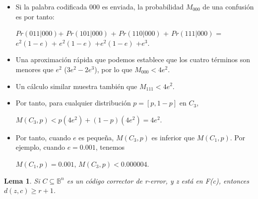 \documentclass{beamer}
\theoremstyle{plain}
\newtheorem{lema} [theorem] {Lema}
\theoremstyle{example}
\theoremstyle{example}
\begin{document}
\begin{frame}  \footnotesize  

\begin{itemize}

\item Si la palabra codificada 000 es enviada, la probabilidad $M_{000}$ de una confusión es por tanto:
\begin{center}
$Pr(011 | 000)$+ $Pr(101 | 000)$ + $Pr(110 | 000)$	+ $Pr(111 | 000)$ = $e^2(1-e)$	+ $e^2(1-e)$	+$e^2(1-e)$	+$e^3$.
\end{center}

\item Una aproximación rápida que podemos establece que los cuatro términos son menores que $e^2$ ($3e^2-2e^3$), por lo que $M_{000} < 4e^2$. 

\item Un cálculo similar muestra también que $M_{111} < 4e^2$. 

\item Por tanto, para cualquier distribución $p = [p, 1 - p]$ en $C_3$,

\begin{center}
$M(C_3, p) < p(4e^2) + (1 - p)(4e^2) = 4e^2$.
\end{center}

\item Por tanto, cuando $e$ es pequeña, $M(C_3,p)$ es inferior que $M(C_1,p)$. Por ejemplo, cuando $e = 0.001$, tenemos 

\begin{center}
$M(C_1,p) = 0.001$,	$M(C_3,p) < 0.000004$.
\end{center}

\end{itemize}

\end{frame} 

\begin{frame}  \small  
\begin{lema}
Si $C \subseteq \mathbb{B}^n$ es un código corrector de r-error, y z está en F(c), entonces $d(z,c) \geq r + 1$.
\end{lema}


\end{frame} 



\end{document}
